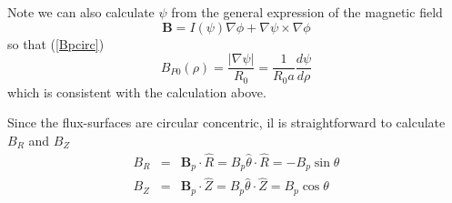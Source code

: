 \documentclass{article}
\begin{document}
Note we can also calculate $\psi $ from the general expression of the
magnetic field 
\[
\mathbf{B}=I\left( \psi \right) \nabla \phi +\nabla \psi \times \nabla \phi 
\]
so that (\ref{Bpcirc}) 
\[
B_{P0}\left( \rho \right) =\frac{\left| \nabla \psi \right| }{R_{0}}=\frac{1%
}{R_{0}a}\frac{d\psi }{d\rho } 
\]
which is consistent with the calculation above.

Since the flux-surfaces are circular concentric, il is straightforward to
calculate $B_{R}$ and $B_{Z}$%
\begin{eqnarray*}
B_{R} &=&\mathbf{B}_{p}\cdot \widehat{R}=B_{p}\widehat{\theta }\cdot 
\widehat{R}=-B_{p}\sin \theta \\
B_{Z} &=&\mathbf{B}_{p}\cdot \widehat{Z}=B_{p}\widehat{\theta }\cdot 
\widehat{Z}=B_{p}\cos \theta
\end{eqnarray*}
\end{document}
